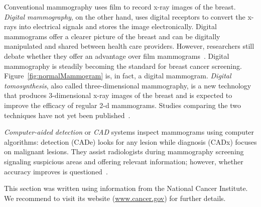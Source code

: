 Conventional mammography uses film to record x-ray images of the breast. \emph{Digital mammography}, on the other hand, uses digital receptors to convert the x-rays into electrical signals and stores the image electronically. Digital mammograms offer a clearer picture of the breast and can be digitally manipulated and shared between health care providers.
However, researchers still debate whether they offer an advantage over film mammograms~\cite{Kerlikowske2011, Pisano2008, Skaane2007}. Digital mammography is steadily becoming the standard for breast cancer screening. Figure~\ref{fig:normalMammogram} is, in fact, a digital mammogram.
\emph{Digital tomosynthesis}, also called three-dimensional mammography, is a new technology that produces 3-dimensional x-ray images of the breast and is expected to improve the efficacy of regular 2-d mammograms. Studies comparing the two techniques have not yet been published~\cite{NCI2014}.

\emph{Computer-aided detection} or \emph{CAD} systems inspect mammograms using computer algorithms: detection (CADe) looks for any lesion while diagnosis (CADx) focuses on malignant lesions.
They assist radiologists during mammography screening signaling suspicious areas and offering relevant information; however, whether accuracy improves is questioned~\cite{Lehman2015}.

This section was written using information from the National Cancer Institute. We recommend to visit its website (\url{www.cancer.gov}) for further details.
